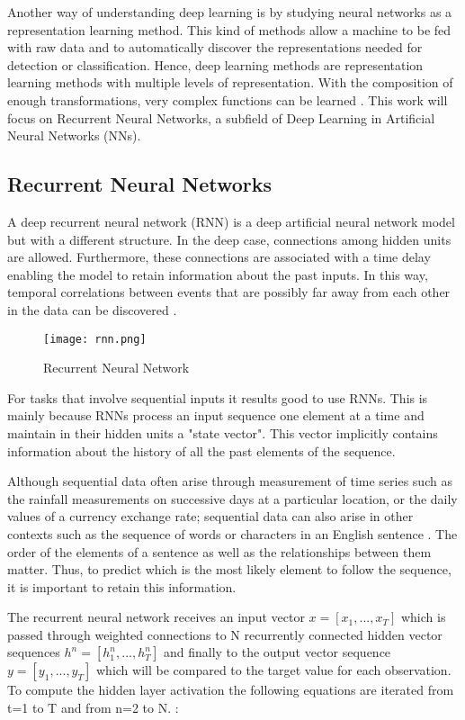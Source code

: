 Another way of understanding deep learning is by studying neural networks as a representation learning method. This kind of methods allow a machine to be fed with raw data and to automatically discover the representations needed for detection or classification. Hence, deep learning methods are representation learning methods with multiple levels of representation. With the composition of enough transformations, very complex functions can be learned \cite{lecun2015deep}. This work will focus on Recurrent Neural Networks, a subfield of Deep Learning in Artificial Neural Networks (NNs).


\subsection{Recurrent Neural Networks}

A deep recurrent neural network (RNN) is a deep artificial neural network model but with a different structure. In the deep case, connections among hidden units are allowed. Furthermore, these connections are associated with a time delay enabling the model to retain information about the past inputs. In this way, temporal correlations between events that are possibly far away from each other in the data can be discovered \cite{pascanu2013difficulty}.

\begin{figure}
\label{fig:rnn}
\center
\texttt{[image: rnn.png]}
\caption{Recurrent Neural Network}
\end{figure}
For tasks that involve sequential inputs it results good to use RNNs. This is mainly because RNNs process an input sequence one element at a time and maintain in their hidden units a "state vector". This vector implicitly contains information about the history of all the past elements of the sequence.\cite{lecun2015deep} 

Although sequential data often arise through measurement of time series such as the rainfall measurements on successive days at a particular location, or the daily values of a currency exchange rate; sequential data can also arise in other contexts such as the sequence of words or characters in an English sentence \cite{bishop2006pattern}. The order of the elements of a sentence as well as the relationships between them matter. Thus, to predict which is the most likely element to follow the sequence, it is important to retain this information.

The recurrent neural network receives an input vector $x=[x_1,...,x_T]$ which is passed through weighted connections to N recurrently connected hidden vector sequences $h^n=[h_1^n,...,h_T^n]$ and finally to the output vector sequence $y=[y_1,...,y_T]$ which will be compared to the target value for each observation. To compute the hidden layer activation the following equations are iterated from t=1 to T and from n=2 to N. \cite{graves2013generating}:

